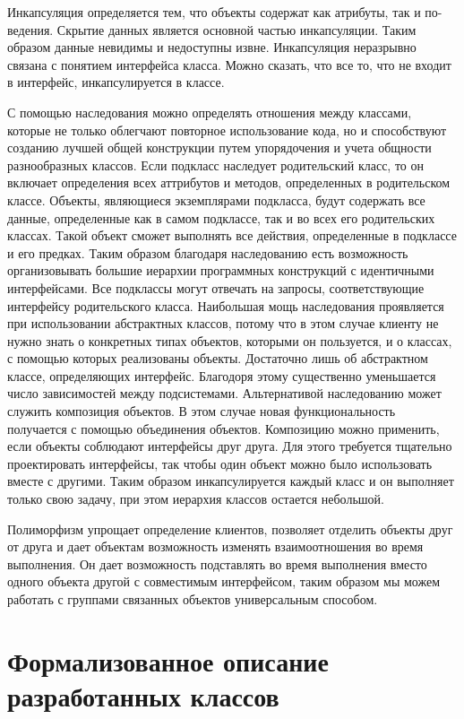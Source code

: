 \documentclass[russian,utf8,simple,hpadding=10mm,vpadding=20mm]{eskdtext}
\begin{document}
Инкапсуляция определяется тем, что объекты содержат как атрибуты, так и по-
ведения. Скрытие данных является основной частью инкапсуляции. Таким образом
данные невидимы и недоступны извне.  Инкапсуляция неразрывно связана с понятием интерфейса класса. Можно сказать, что все то, что не входит в интерфейс, инкапсулируется в классе.

С помощью наследования можно определять отношения между классами, которые не только облегчают повторное использование кода, но и способствуют созданию лучшей общей конструкции путем упорядочения и учета общности разнообразных классов.
Если подкласс наследует родительский класс, то он включает определения всех
аттрибутов и методов, определенных в родительском классе. Объекты, являющиеся экземплярами подкласса, будут содержать все данные, определенные как в самом подклассе, так и во всех его родительских классах. Такой объект сможет выполнять все действия, определенные в подклассе и его предках. Таким образом благодаря наследованию есть возможность организовывать большие иерархии программных конструкций с идентичными интерфейсами. Все
подклассы могут отвечать на запросы, соответствующие интерфейсу родительского класса. Наибольшая мощь наследования проявляется при использовании абстрактных классов, потому что в этом случае клиенту не нужно знать о конкретных типах объектов, которыми он пользуется,  и о классах, с помощью которых реализованы объекты. Достаточно лишь об абстрактном классе, определяющих интерфейс. Благодоря этому существенно уменьшается число зависимостей между подсистемами. Альтернативой наследованию может служить композиция объектов. В этом случае новая функциональность получается с помощью объединения объектов. Композицию можно применить, если объекты соблюдают интерфейсы друг друга. Для этого требуется тщательно проектировать интерфейсы, так чтобы один объект можно было использовать вместе с другими. Таким образом инкапсулируется каждый класс и он выполняет только свою задачу, при этом иерархия классов остается небольшой.

Полиморфизм упрощает определение клиентов, позволяет отделить объекты друг от друга и дает объектам возможность изменять взаимоотношения во время выполнения. Он дает возможность подставлять во время выполнения вместо одного объекта другой с совместимым интерфейсом, таким образом мы можем работать с группами связанных объектов универсальным способом.

\newpage
\parindent=15mm
\doublespacing
\section{Формализованное описание разработанных классов}
\end{document}
